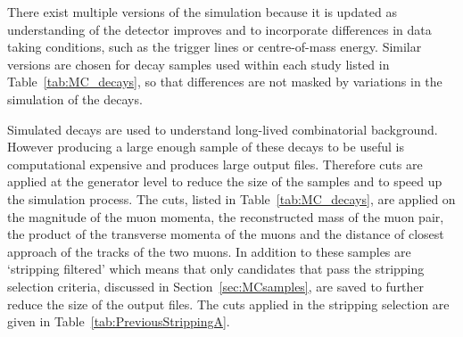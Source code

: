 There exist multiple versions of the simulation because it is updated as understanding of the detector improves and to incorporate differences in data taking conditions, such as the trigger lines or centre-of-mass energy. 
Similar versions are chosen for decay samples used within each study listed in Table~\ref{tab:MC_decays}, so that differences are not masked by variations in the simulation of the decays.




Simulated \bbbarmumux decays are used to understand long-lived combinatorial background. However producing a large enough sample of these decays to be useful is computational expensive and produces large output files. Therefore cuts are applied at the generator level to reduce the size of the samples and to speed up the simulation process. The cuts, listed in Table~\ref{tab:MC_decays}, are applied on the magnitude of the muon momenta, the reconstructed mass of the muon pair, the product of the transverse momenta of the muons and the distance of closest approach of the tracks of the two muons. In addition to these samples are `stripping filtered' which means that only candidates that pass the \bmumu stripping selection criteria, discussed in Section~\ref{sec:MCsamples}, are saved to further reduce the size of the output files. The cuts applied in the stripping selection are given in Table~\ref{tab:PreviousStrippingA}.%
  

